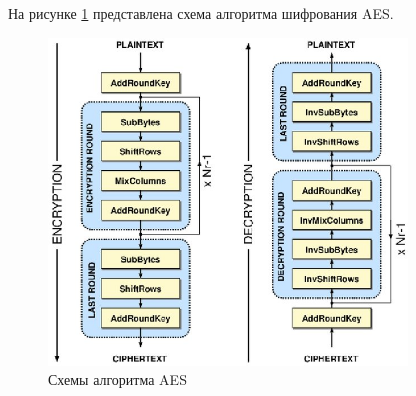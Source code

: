 На рисунке \ref{fig:algo} представлена схема алгоритма шифрования AES.

\begin{figure}[h!]
	\centering
	\includegraphics[width=0.85\textwidth]{img/AES.jpg}
	\caption{Схемы алгоритма AES}
	\label{fig:algo}
\end{figure}
\clearpage

